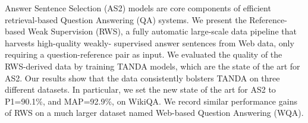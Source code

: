 Answer Sentence Selection (AS2) models are core components of efficient retrieval-based Question Answering (QA) systems. We present the Reference-based Weak Supervision (RWS), a fully automatic large-scale data pipeline that harvests high-quality weakly- supervised answer sentences from Web data, only requiring a question-reference pair as input. We evaluated the quality of the RWS-derived data by training TANDA models, which are the state of the art for AS2. Our results show that the data consistently bolsters TANDA on three different datasets. In particular, we set the new state of the art for AS2 to P\@1=90.1\%, and MAP=92.9\%, on WikiQA. We record similar performance gains of RWS on a much larger dataset named Web-based Question Answering (WQA).
